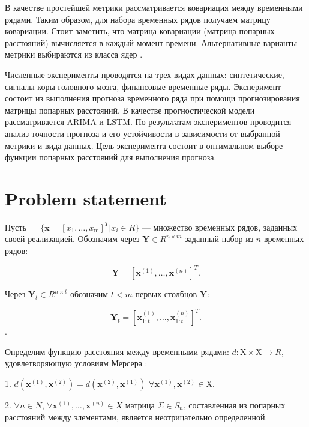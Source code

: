 \documentclass{article}
\begin{document}
В качестве простейшей метрики рассматривается ковариация между временными рядами. \cite{Boyd} Таким образом, для набора временных рядов получаем матрицу ковариации. Стоит заметить, что матрица ковариации (матрица попарных расстояний) вычисляется в каждый момент времени. Альтернативные варианты метрики выбираются из класса ядер \cite{shawe2004kernel}.

Численные эксперименты проводятся на трех видах данных: синтетические, сигналы коры головного мозга, финансовые временные ряды. Эксперимент состоит из выполнения прогноза временного ряда при помощи прогнозирования матрицы попарных расстояний. В качестве прогностической модели рассматривается ARIMA и LSTM. По результатам экспериментов проводится анализ точности прогноза и его устойчивости в зависимости от выбранной метрики и вида данных. Цель эксперимента состоит в оптимальном выборе функции попарных расстояний для выполнения прогноза.

\section{Problem statement}

Пусть  $ = \{\mathbf{x} = [x_1, \ldots, x_\text{m}]^T | x_i \in R\}$ --- множество временных рядов, заданных своей реализацией. Обозначим через  $\mathbf{Y} \in R^{n \times m}$ заданный набор из $n$ временных рядов:

\begin{equation}
    \mathbf{Y} = [\mathbf{x}^{(1)}, \ldots, \mathbf{x}^{(n)}]^T.
\end{equation}

 Через $\mathbf{Y}_t \in R^{n \times t}$ обозначим $t < m$ первых столбцов $\mathbf{Y}$: 
 
 \begin{equation}
    \mathbf{Y}_t = [\mathbf{x}_{1:t}^{(1)}, \ldots, \mathbf{x}_{1:t}^{(n)}]^T.
\end{equation}. 

Определим функцию расстояния между временными рядами: $d : \text{X} \times \text{X} \rightarrow R$, удовлетворяющую условиям Мерсера \cite{ghojogh2021reproducing}:

1. $d(\mathbf{x}^{(1)}, \mathbf{x}^{(2)}) = d(\mathbf{x}^{(2)}, \mathbf{x}^{(1)})$ $\forall \mathbf{x}^{(1)}, \mathbf{x}^{(2)} \in \text{X}$.

2. $\forall n \in N$, $\forall \mathbf{x}^{(1)}, \ldots, \mathbf{x}^{(n)} \in X$ матрица $\Sigma \in S_n$, составленная из попарных расстояний между элементами, является неотрицательно определенной.
\end{document}
